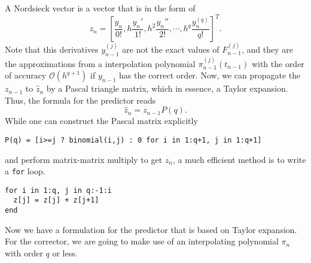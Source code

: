 \documentclass[11pt,a4paper]{article}
\begin{document}
A Nordsieck vector is a vector that is in the form of
\begin{equation}
        z_n = \left[\frac{y_n}{0!}, h\frac{y_n'}{1!}, h^2\frac{y_n''}{2!},
        \cdots, h^q\frac{y_n^{(q)}}{q!}\right]^T.
\end{equation}
Note that this derivatives $y_{n-1}^{(j)}$ are not the exact values of
$F^{(j)}_{n-1}$, and they are the approximations from a interpolation
polynomial $\pi_{n-1}^{(j)}(t_{n-1})$ with the order of accuracy
$\mathcal{O}(h^{q+1})$ if $y_{n-1}$ has the correct order. Now, we can
propagate the $z_{n-1}$ to $\hat{z}_{n}$ by a Pascal triangle matrix, which in
essence, a Taylor expansion. Thus, the formula for the predictor reads
\begin{equation}
  \hat{z}_n = z_{n-1}P(q).
\end{equation}
While one can construct the Pascal matrix explicitly
\begin{lstlisting}
P(q) = [i>=j ? binomial(i,j) : 0 for i in 1:q+1, j in 1:q+1]
\end{lstlisting}
and perform matrix-matrix multiply to get $z_n$, a much efficient method is to
write a \texttt{for} loop.
\begin{lstlisting}
for i in 1:q, j in q:-1:i
  z[j] = z[j] + z[j+1]
end
\end{lstlisting}

Now we have a formulation for the predictor that is based on Taylor expansion.
For the corrector, we are going to make use of an interpolating polynomial
$\pi_{n}$ with order $q$ or less.

\end{document}
